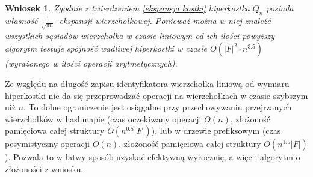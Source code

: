 \documentclass{pracamgr}
\newtheorem{corollary}[theorem]{Wniosek}
\begin{document}
   \begin{corollary}\label{ekspansywna spojnosc dla kostki}
    Zgodnie z twierdzeniem \ref{ekspansja kostki} hiperkostka $Q_n$ posiada własność
    $\frac{1}{\sqrt{\pi n}}$--ekspansji wierzchołkowej.
    Ponieważ można w niej znaleźć wszystkich sąsiadów wierzchołka w czasie liniowym od ich ilości powyższy algorytm testuje spójność wadliwej hiperkostki w czasie
    ${O(|F|^2\cdot n^{3.5})}$ (wyrażonego w ilości operacji arytmetycznych).
   \end{corollary}
    Ze względu na długość zapisu identyfikatora wierzchołka liniową od wymiaru hiperkostki nie da się przeprowadzać operacji na wierzchołkach w czasie szybszym niż
    $n$. To dolne ograniczenie jest osiągalne przy przechowywaniu przejrzanych wierzchołków w hashmapie
    (czas oczekiwany operacji $O(n)$, złożoność pamięciowa całej struktury $O(n^{0.5}|F|)$),
    lub w drzewie prefiksowym (czas pesymistyczny operacji $O(n)$, złożoność pamięciowa całej struktury $O(n^{1.5}|F|)$).
    Pozwala to w łatwy sposób uzyskać efektywną wyrocznię, a więc i algorytm o złożoności z wniosku.
\end{document}
